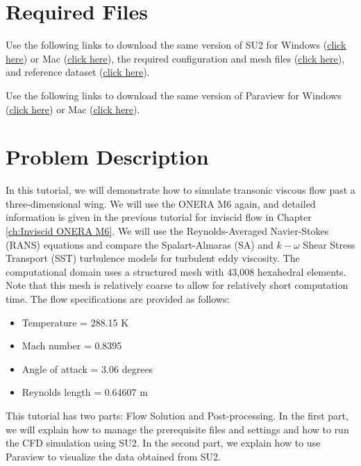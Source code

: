 \section{Required Files}
\begin{su2note}
	Use the following links to download the same version of SU2 for Windows (\href{https://users.encs.concordia.ca/~bvermeir/book/executables/windows/SU2_Windows.zip}{\underline{click here}}) or Mac (\href{https://users.encs.concordia.ca/~bvermeir/book/executables/osx/SU2_Mac.zip}{\underline{click here}}), the required configuration and mesh files (\href{https://gitlab.com/bvermeir/book-cfd/blob/master/tutorial/tut5_turbulent_oneram6/oneram6_turbulent.zip}{\underline{click here}}), and reference dataset (\href{https://gitlab.com/bvermeir/book-cfd/blob/master/tutorial/tut5_turbulent_oneram6/experimental_values.zip}{\underline{click here}}).
\end{su2note}
\begin{paraviewnote}
	Use the following links to download the same version of Paraview for Windows (\href{https://users.encs.concordia.ca/~bvermeir/book/executables/windows/ParaView-5.4.0-Qt5-OpenGL2-Windows-64bit.exe}{\underline{click here}}) or Mac (\href{https://users.encs.concordia.ca/~bvermeir/book/executables/osx/ParaView-5.4.0-Qt5-OpenGL2-MPI-OSX10.8-64bit.dmg}{\underline{click here}}).
\end{paraviewnote}

\section{Problem Description}
In this tutorial, we will demonstrate how to simulate transonic viscous flow past a three-dimensional wing. We will use the ONERA M6 again, and detailed information is given in the previous tutorial for inviscid flow in Chapter \ref{ch:Inviscid ONERA M6}. We will use the Reynolds-Averaged Navier-Stokes (RANS) equations and compare the Spalart-Almaras (SA) and $k-\omega$ Shear Stress Transport (SST) turbulence models for turbulent eddy viscosity. The computational domain uses a structured mesh with 43,008 hexahedral elements. Note that this mesh is relatively coarse to allow for relatively short computation time. The flow specifications are provided as follows:
\begin{itemize}
    \item Temperature = 288.15 K
    \item Mach number = 0.8395
    \item Angle of attack = 3.06 degrees
    \item Reynolds length = 0.64607 m
\end{itemize}
This tutorial has two parts: Flow Solution and Post-processing. In the first part, we will explain how to manage the prerequisite files and settings and how to run the CFD simulation using SU2. In the second part, we explain how to use Paraview to visualize the data obtained from SU2.
